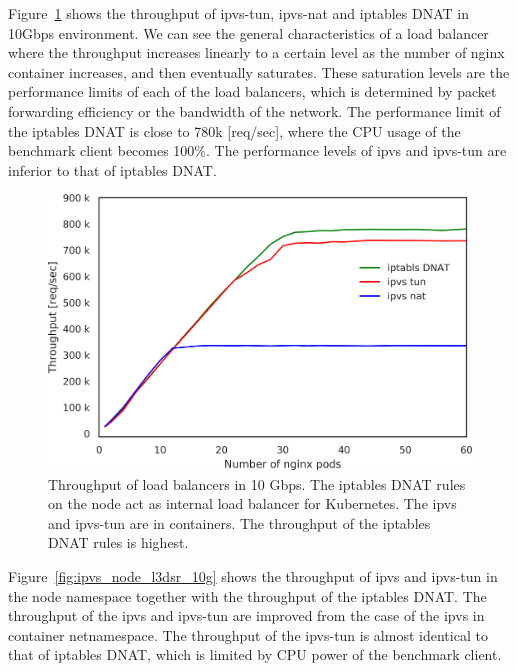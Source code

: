 Figure~\ref{fig:ipvs_l3dsr_10g} shows the throughput of ipvs-tun, ipvs-nat and iptables DNAT in 10Gbps environment.
We can see the general characteristics of a load balancer where the throughput increases linearly to a certain level as the number of nginx container increases, and then eventually saturates.
These saturation levels are the performance limits of each of the load balancers, which is determined by packet forwarding efficiency or the bandwidth of the network.
The performance limit of the iptables DNAT is close to 780k [req/sec], where the CPU usage of the benchmark client becomes 100\%.
The performance levels of ipvs and ipvs-tun are inferior to that of iptables DNAT. 

\begin{figure}[h]
  \centering
  \includegraphics[width=0.8\columnwidth]{Figs/ipvs_l3dsr_10g}
  \par\bigskip
  \centering
  \begin{minipage}{0.9\columnwidth}
    \caption[Throughput of load balancers in 10 Gbps]{
      Throughput of load balancers in 10 Gbps.
      The iptables DNAT rules on the node act as internal load balancer for Kubernetes.
      The ipvs and ipvs-tun are in containers.
      The throughput of the iptables DNAT rules is highest.
    }
    \label{fig:ipvs_l3dsr_10g}
  \end{minipage}
\end{figure}

Figure~\ref{fig:ipvs_node_l3dsr_10g} shows the throughput of ipvs and ipvs-tun in the node namespace together with the throughput of the iptables DNAT.
The throughput of the ipvs and ipvs-tun are improved from the case of the ipvs in container netnamespace.
The throughput of the ipvs-tun is almost identical to that of iptables DNAT, which is limited by CPU power of the benchmark client. 
%


